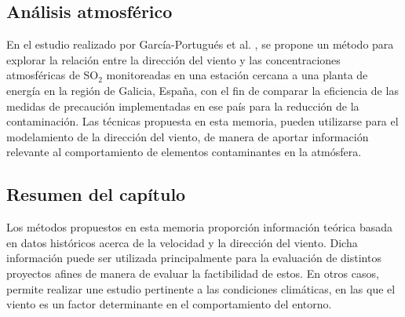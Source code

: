\subsection{Análisis atmosférico}
En el estudio realizado por García-Portugués et al. \cite{Portugues12}, se propone un método para explorar la relación entre la dirección del viento y las concentraciones atmosféricas de SO$_2$ monitoreadas en una estación cercana a una planta de energía en la región de Galicia, España, con el fin de comparar la eficiencia de las medidas de precaución implementadas en ese país para la reducción de la contaminación. Las técnicas propuesta en esta memoria, pueden utilizarse para el modelamiento de la dirección del viento, de manera de 
aportar información relevante al comportamiento de elementos contaminantes en la atmósfera.

\subsection{Resumen del capítulo}
Los métodos propuestos en esta memoria proporción información teórica basada en datos históricos acerca de la velocidad y la dirección del viento. Dicha información puede ser utilizada principalmente para la evaluación de distintos proyectos afines de manera de evaluar la factibilidad de estos. En otros casos, permite realizar une estudio pertinente a las condiciones climáticas, en las que el viento es un factor determinante en el comportamiento del entorno.